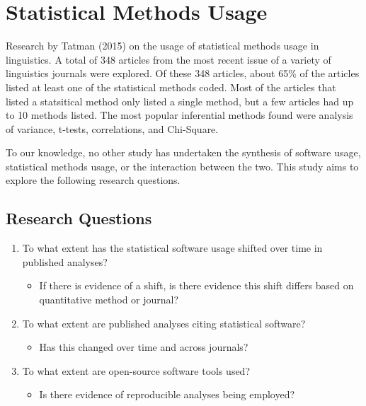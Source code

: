 \documentclass[english,,man]{apa6}
\providecommand{\tightlist}{%
  \setlength{\itemsep}{0pt}\setlength{\parskip}{0pt}}
\theoremstyle{definition}
\theoremstyle{definition}
\theoremstyle{definition}
\theoremstyle{remark}
\begin{document}
\hypertarget{statistical-methods-usage}{%
\section{Statistical Methods Usage}\label{statistical-methods-usage}}

Research by Tatman (2015) on the usage of statistical methods usage in
linguistics. A total of 348 articles from the most recent issue of a
variety of linguistics journals were explored. Of these 348 articles,
about 65\% of the articles listed at least one of the statistical
methods coded. Most of the articles that listed a statsitical method
only listed a single method, but a few articles had up to 10 methods
listed. The most popular inferential methods found were analysis of
variance, t-tests, correlations, and Chi-Square.

To our knowledge, no other study has undertaken the synthesis of
software usage, statistical methods usage, or the interaction between
the two. This study aims to explore the following research questions.

\hypertarget{research-questions}{%
\subsection{Research Questions}\label{research-questions}}

\begin{enumerate}
\def\labelenumi{\arabic{enumi}.}
\tightlist
\item
  To what extent has the statistical software usage shifted over time in
  published analyses?

  \begin{itemize}
  \tightlist
  \item
    If there is evidence of a shift, is there evidence this shift
    differs based on quantitative method or journal?
  \end{itemize}
\item
  To what extent are published analyses citing statistical software?

  \begin{itemize}
  \tightlist
  \item
    Has this changed over time and across journals?
  \end{itemize}
\item
  To what extent are open-source software tools used?

  \begin{itemize}
  \tightlist
  \item
    Is there evidence of reproducible analyses being employed?
  \end{itemize}
\end{enumerate}
\end{document}
